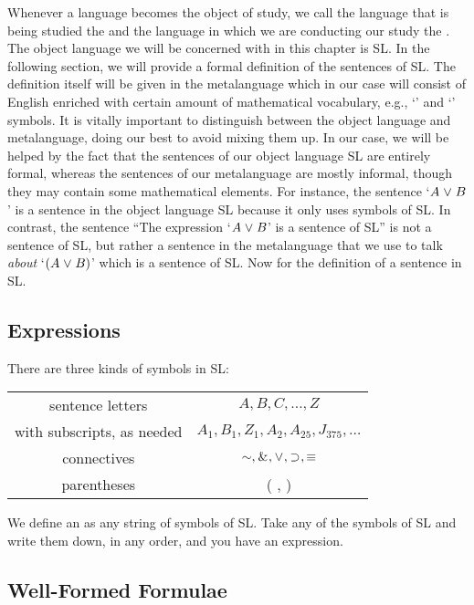 Whenever a language becomes the object of study, we call the language that is being studied the  and the language in which we are conducting our study the . \label{def.metalanguage}
The object language we will be concerned with in this chapter is SL.
In the following section, we will provide a formal definition of the sentences of SL. 
The definition itself will be given in the metalanguage which in our case will consist of English enriched with certain amount of mathematical vocabulary, e.g., `\metaA{}' and `\metaB{}' symbols.
It is vitally important to distinguish between the object language and metalanguage, doing our best to avoid mixing them up.
In our case, we will be helped by the fact that the sentences of our object language SL are entirely formal, whereas the sentences of our metalanguage are mostly informal, though they may contain some mathematical elements.
For instance, the sentence `$A\mkern1mu\vee\mkern1mu B$' is a sentence in the object language SL because it only uses symbols of SL. 
In contrast, the sentence ``The expression `$A\mkern1mu\vee\mkern1mu B$' is a sentence of SL'' is not a sentence of SL, but rather a sentence in the metalanguage that we use to talk \emph{about} `$(A\mkern1mu\vee\mkern1mu B)$' which is a sentence of SL.
Now for the definition of a sentence in SL.


\subsection{Expressions}

There are three kinds of symbols in SL:

\begin{center}
\begin{tabular}{|c|c|}
\hline
sentence letters & $A,B,C,\ldots,Z$\\
with subscripts, as needed & $A_1, B_1,Z_1,A_2,A_{25},J_{375},\ldots$\\
\hline
connectives & $\enot,\eand,\eor,\eif,\eiff$\\
\hline
parentheses&( , )\\
\hline
\end{tabular}
\end{center}

We define an  as any string of symbols of SL. Take any of the symbols of SL and write them down, in any order, and you have an expression.


\subsection{Well-Formed Formulae}
\label{sec:wff}

